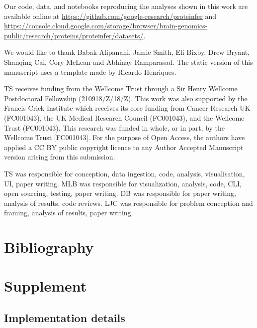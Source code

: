 Our code, data, and notebooks reproducing the analyses shown in this work are available online at \url{https://github.com/google-research/proteinfer} and \url{https://console.cloud.google.com/storage/browser/brain-genomics-public/research/proteins/proteinfer/datasets/}.


\begin{acknowledgements}
  We would like to thank Babak Alipanahi, Jamie Smith, Eli Bixby, Drew Bryant, Shanqing Cai, Cory McLean and Abhinay Ramparasad. The static version of this manuscript uses a template made by Ricardo Henriques.

  TS receives funding from the Wellcome Trust through a Sir Henry Wellcome Postdoctoral Fellowship (210918/Z/18/Z). This work was also supported by the Francis Crick Institute which receives its core funding from Cancer Research UK (FC001043), the UK Medical Research Council (FC001043), and the Wellcome Trust (FC001043). This research was funded in whole, or in part, by the Wellcome Trust [FC001043]. For the purpose of Open Access, the authors have applied a CC BY public copyright licence to any Author Accepted Manuscript version arising from this submission.



\end{acknowledgements}
  \begin{contributions}
  TS was responsible for conception, data ingestion, code, analysis, visualisation, UI, paper writing. MLB was
  responsible for visualization, analysis, code, CLI, open sourcing, testing, paper writing. DB was responsible for
  paper writing, analysis of results, code reviews. LJC was responsible for problem conception and framing, analysis of results, paper writing.
  \end{contributions}

  
  \section*{Bibliography}


\onecolumn
\newpage

\section*{Supplement}
\beginsupplement

\subsection{Implementation details}

